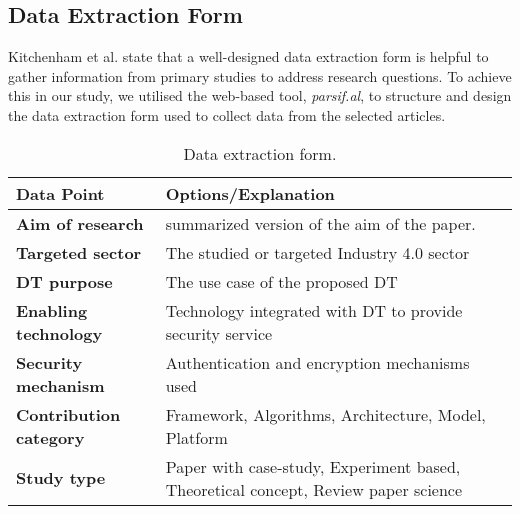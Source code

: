 
\subsection{Data Extraction Form}
Kitchenham et al.\cite{kitchenham_guidelines_2007} state that a well-designed data extraction form is helpful to gather information from primary studies to address research questions. To achieve this in our study, we utilised the web-based tool, \textit{parsif.al}, to structure and design the data extraction form used to collect data from the selected articles. 




\begin{table}[h]
\small
\centering
\caption{ Data extraction form.}
\label{tbl:extraction}
\begin{NiceTabular}{p{4cm}p{8cm}}
\toprule
    \textbf{Data Point} & \textbf{Options/Explanation} \\
    \midrule
    \textbf{Aim of research} & summarized version of the aim of the paper. \\ 
    \textbf{Targeted sector} & The studied or targeted Industry 4.0 sector \\
    \textbf{DT purpose} & The use case of the proposed DT \\ 
    \textbf{Enabling technology} & Technology integrated with DT to provide security service \\ 
    \textbf{Security mechanism} &  Authentication and encryption mechanisms used   \\ 
    \textbf{Contribution category} & Framework, Algorithms, Architecture, Model, Platform \\
    \textbf{Study type} & Paper with case-study, Experiment based, Theoretical concept, Review paper science  \\
\bottomrule
\end{NiceTabular}
\end{table}